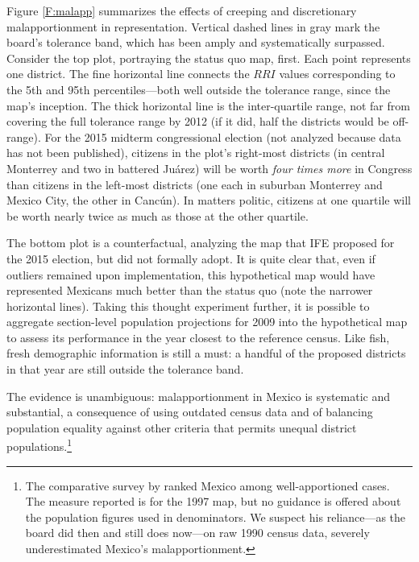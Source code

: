\documentclass[letter,12pt]{article}
\begin{document}
Figure \ref{F:malapp} summarizes the effects of creeping and discretionary malapportionment in representation. Vertical dashed lines in gray mark the board's tolerance band, which has been amply and systematically surpassed. Consider the top plot, portraying the status quo map, first. Each point represents one district. The fine horizontal line connects the $RRI$ values corresponding to the 5th and 95th percentiles---both well outside the tolerance range, since the map's inception. The thick horizontal line is the inter-quartile range, not far from covering the full tolerance range by 2012 (if it did, half the districts would be off-range). For the 2015 midterm congressional election (not analyzed because data has not been published), citizens in the plot's right-most districts (in central Monterrey and two in battered Ju\'arez) will be worth \emph{four times more} in Congress than citizens in the left-most districts (one each in suburban Monterrey and Mexico City, the other in Canc\'un). In matters politic, citizens at one quartile will be worth nearly twice as much as those at the other quartile. 

The bottom plot is a counterfactual, analyzing the map that IFE proposed for the 2015 election, but did not formally adopt. It is quite clear that, even if outliers remained upon implementation, this hypothetical map would have represented Mexicans much better than the status quo (note the narrower horizontal lines). Taking this thought experiment further, it is possible to aggregate section-level population projections for 2009 into the hypothetical map to assess its performance in the year closest to the reference census. Like fish, fresh demographic information is still a must: a handful of the proposed districts in that year are still outside the tolerance band. 


The evidence is unambiguous: malapportionment in Mexico is systematic and substantial, a consequence of using outdated census data and of balancing population equality against other criteria that permits unequal district populations.\footnote{The comparative survey by \citet{snyder.samuelsMalapp2004} ranked Mexico among well-apportioned cases. The measure reported is for the 1997 map, but no guidance is offered about the population figures used in denominators. We suspect his reliance---as the board did then and still does now---on raw 1990 census data, severely underestimated Mexico's malapportionment.} 
\end{document}
